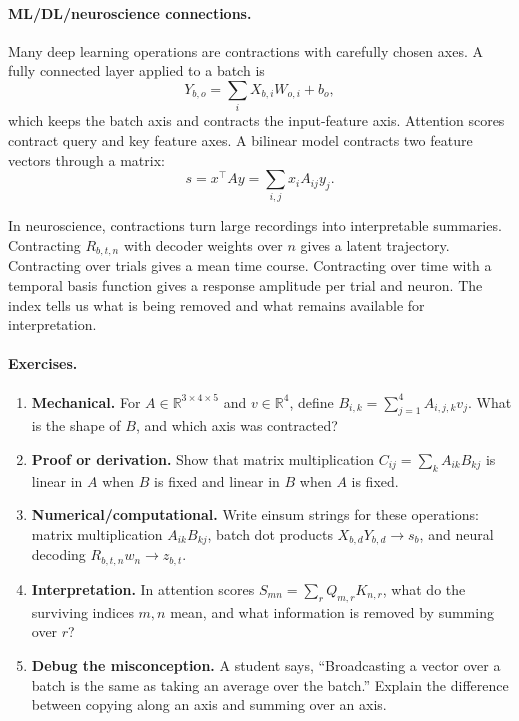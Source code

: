 \paragraph{ML/DL/neuroscience connections.}
Many deep learning operations are contractions with carefully chosen axes. A fully connected layer applied to a batch is
\[
Y_{b,o}=\sum_i X_{b,i}W_{o,i}+b_o,
\]
which keeps the batch axis and contracts the input-feature axis. Attention scores contract query and key feature axes. A bilinear model contracts two feature vectors through a matrix:
\[
s=x^\top A y=\sum_{i,j}x_iA_{ij}y_j.
\]

In neuroscience, contractions turn large recordings into interpretable summaries. Contracting \(R_{b,t,n}\) with decoder weights over \(n\) gives a latent trajectory. Contracting over trials gives a mean time course. Contracting over time with a temporal basis function gives a response amplitude per trial and neuron. The index tells us what is being removed and what remains available for interpretation.

\paragraph{Exercises.}
\begin{enumerate}[label=\textbf{7.2.\arabic*.}, leftmargin=*]
\item \textbf{Mechanical.} For \(A\in\mathbb{R}^{3\times 4\times 5}\) and \(v\in\mathbb{R}^4\), define \(B_{i,k}=\sum_{j=1}^4 A_{i,j,k}v_j\). What is the shape of \(B\), and which axis was contracted?
\item \textbf{Proof or derivation.} Show that matrix multiplication \(C_{ij}=\sum_k A_{ik}B_{kj}\) is linear in \(A\) when \(B\) is fixed and linear in \(B\) when \(A\) is fixed.
\item \textbf{Numerical/computational.} Write einsum strings for these operations: matrix multiplication \(A_{ik}B_{kj}\), batch dot products \(X_{b,d}Y_{b,d}\to s_b\), and neural decoding \(R_{b,t,n}w_n\to z_{b,t}\).
\item \textbf{Interpretation.} In attention scores \(S_{mn}=\sum_r Q_{m,r}K_{n,r}\), what do the surviving indices \(m,n\) mean, and what information is removed by summing over \(r\)?
\item \textbf{Debug the misconception.} A student says, ``Broadcasting a vector over a batch is the same as taking an average over the batch.'' Explain the difference between copying along an axis and summing over an axis.
\end{enumerate}

